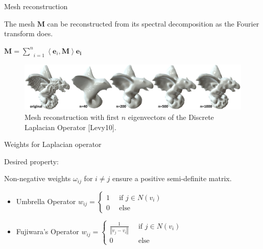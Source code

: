 \documentclass[10pt, compress, english]{beamer}
\begin{document}
\begin{frame}{Mesh reconstruction}


The mesh $\mathbf{M}$ can be reconstructed from its spectral decomposition as the  Fourier transform does.


\begin{center}
$\mathbf{M}=\underset{i=1}{\overset{n}{\sum}}\left\langle \mathbf{e}_{i},\mathbf{M}\right\rangle \mathbf{e_{i}}$
\par\end{center}


\begin{figure}
\includegraphics[width=1\textwidth]{img/Reconstructions_With_Eigenvectors}

\protect\caption{Mesh reconstruction with first $n$ eigenvectors of the Discrete Laplacian
Operator {[}Levy10{]}.}


\end{figure}


\end{frame}

\begin{frame}{Weights for Laplacian operator}


Desired property:

Non-negative weights $\omega_{ij}$ for $i\neq j$ ensure a positive
semi-definite matrix.
\begin{itemize}
\item Umbrella Operator $w_{ij}=\begin{cases}
1 & \,\,\,\mbox{if }j\in N\left(v_{i}\right)\\
0 & \,\,\,\mbox{else}
\end{cases}$
\item Fujiwara's Operator $w_{ij}=\begin{cases}
\frac{1}{\left\Vert v_{j}-v_{i}\right\Vert } & \,\,\,\mbox{if }j\in N\left(v_{i}\right)\\
0 & \,\,\,\mbox{else}
\end{cases}$
\end{itemize}






\end{frame}
\end{document}
